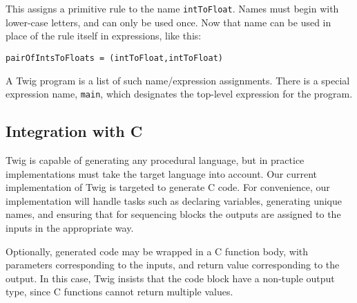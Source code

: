 This assigns a primitive rule to the name \texttt{intToFloat}. Names must begin with lower-case letters, and can only be used once. Now that name can be used in place of the rule itself in expressions, like this:

\begin{verbatim}
pairOfIntsToFloats = (intToFloat,intToFloat)
\end{verbatim}

A Twig program is a list of such name/expression assignments. There is a special expression name, \texttt{main}, which designates the top-level expression for the program.

\subsection{Integration with C}
\label{twig:concrete-code-gen}

Twig is capable of generating any procedural language, but in practice implementations must take the target language into account. Our current implementation of Twig is targeted to generate C code. For convenience, our implementation will handle tasks such as declaring variables, generating unique names, and ensuring that for sequencing blocks the outputs are assigned to the inputs in the appropriate way.

Optionally, generated code may be wrapped in a C function body, with parameters corresponding to the inputs, and return value corresponding to the output. In this case, Twig insists that the code block have a non-tuple output type, since C functions cannot return multiple values.
